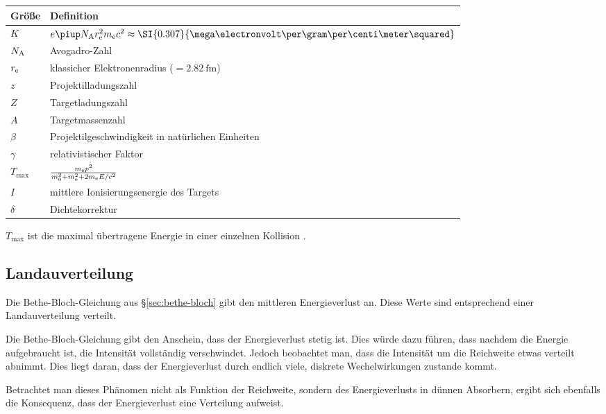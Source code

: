 \documentclass[11pt, ngerman, fleqn, DIV=15, headinclude, BCOR=2cm]{scrreprt}
\begin{document}
\begin{tabular}{ll}
    Größe & Definition \\
    \midrule
    $K$ & $e\piup N_\text A r_\text e^2 m_\text e c^2 \approx
    \SI{0.307}{\mega\electronvolt\per\gram\per\centi\meter\squared}$ \\
    $N_\text A$ & Avogadro-Zahl \\
    $r_\text e$ & klassicher Elektronenradius ($= \SI{2.82}{\femto\meter}$)
    \\
    $z$ & Projektilladungszahl \\
    $Z$ & Targetladungszahl \\
    $A$ & Targetmassenzahl \\
    $\beta$ & Projektilgeschwindigkeit in natürlichen Einheiten \\
    $\gamma$ & relativistischer Faktor \\
    $T_\text{max}$ & $\frac{m_\text e p^2}{m_0^2 + m_\text e^2 + 2 m_\text e E / c^2}$ \\
    $I$ & mittlere Ionisierungsenergie des Targets \\
    $\delta$ & Dichtekorrektur
\end{tabular}

$T_\text{max}$ ist die maximal übertragene Energie in einer einzelnen
Kollision \parencite[24]{Leo/Techniques_Nuclear_Experiments}.

\subsection{Landauverteilung}
\label{sec:landauverteilung}

Die Bethe-Bloch-Gleichung aus §\ref{sec:bethe-bloch} gibt den mittleren
Energieverlust an. Diese Werte sind entsprechend einer Landauverteilung
verteilt. \parencite[44]{Grupen/Astroteilchenphysik}

Die Bethe-Bloch-Gleichung gibt den Anschein, dass der Energieverlust stetig
ist. Dies würde dazu führen, dass nachdem die Energie aufgebraucht ist, die
Intensität vollständig verschwindet. Jedoch beobachtet man, dass die Intensität
um die Reichweite etwas verteilt abnimmt. Dies liegt daran, dass der
Energieverlust durch endlich viele, diskrete Wechelwirkungen zustande kommt.
\parencite[§2.2.9]{Leo/Techniques_Nuclear_Experiments}

Betrachtet man dieses Phänomen nicht als Funktion der Reichweite, sondern des
Energieverlusts in dünnen Absorbern, ergibt sich ebenfalls die Konsequenz, dass
der Energieverlust eine Verteilung aufweist.
\parencite[§2.6]{Leo/Techniques_Nuclear_Experiments}
\end{document}
